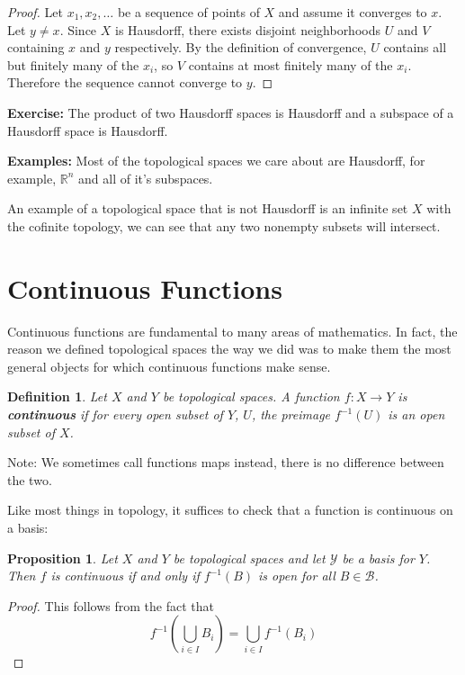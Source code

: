 \documentclass[a4paper]{article}
\newtheorem{definition}[theorem]{Definition}
\newtheorem{proposition}[theorem]{Proposition}
\numberwithin{theorem}{section}
\begin{document}
\begin{proof}
Let $x_1,x_2,\dots$ be a sequence of points of $X$ and assume it converges to $x$. Let $y \neq x$. Since $X$ is Hausdorff, there exists disjoint neighborhoods $U$ and $V$ containing $x$ and $y$ respectively. By the definition of convergence, $U$ contains all but finitely many of the $x_i$, so $V$ contains at most finitely many of the $x_i$. Therefore the sequence cannot converge to $y$.
\end{proof}

\textbf{Exercise:} The product of two Hausdorff spaces is Hausdorff and a subspace of a Hausdorff space is Hausdorff.

\textbf{Examples:} Most of the topological spaces we care about are Hausdorff, for example, $\mathbb{R}^n$ and all of it's subspaces.

An example of a topological space that is not Hausdorff is an infinite set $X$ with the cofinite topology, we can see that any two nonempty subsets will intersect.

\section{Continuous Functions}

Continuous functions are fundamental to many areas of mathematics. In fact, the reason we defined topological spaces the way we did was to make them the most general objects for which continuous functions make sense.

\begin{definition}
Let $X$ and $Y$ be topological spaces. A function $f: X \rightarrow Y$ is \textbf{continuous} if for every open subset of $Y$, $U$, the preimage $f^{-1}(U)$ is an open subset of $X$.
\end{definition}

Note: We sometimes call functions maps instead, there is no difference between the two.

Like most things in topology, it suffices to check that a function is continuous on a basis:

\begin{proposition}
Let $X$ and $Y$ be topological spaces and let $\mathcal{Y}$ be a basis for $Y$. Then $f$ is continuous if and only if $f^{-1}(B)$ is open for all $B \in \mathcal{B}$.
\end{proposition}

\begin{proof}
This follows from the fact that
$$f^{-1}\left( \bigcup_{i \in I} B_i  \right) =  \bigcup_{i \in I} f^{-1}(B_i) $$
\end{proof}
\end{document}
